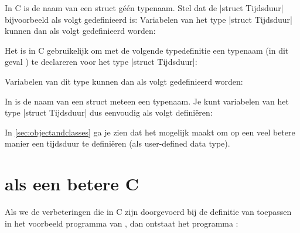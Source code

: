 \begin{cpplstShortInline}
\markright{}
\label{sec:structnotypedef}
In C is de naam van een struct géén typenaam.
Stel dat de |struct Tijdsduur| bijvoorbeeld als volgt gedefinieerd is:
Variabelen van het type |struct Tijdsduur| kunnen dan als volgt gedefinieerd worden:

Het is in C gebruikelijk om met de volgende typedefinitie een typenaam (in dit geval ) te declareren voor het type |struct Tijdsduur|:

Variabelen van dit type kunnen dan als volgt gedefinieerd worden:

In \Cpp{} is de naam van een struct meteen een typenaam.
Je kunt variabelen van het type |struct Tijdsduur| dus eenvoudig als volgt definiëren:

In \cref{sec:objectandclasses} ga je zien dat \Cpp{} het mogelijk maakt om op een veel betere manier een tijdsduur te definiëren (als user-defined data type).

\section[C++ als een betere C]{\Cpp{} als een betere C}
Als we de verbeteringen die in C zijn doorgevoerd bij de definitie van \Cpp{} toepassen in het voorbeeld programma van , dan ontstaat het \Cpp{} programma :


\end{cpplstShortInline}

